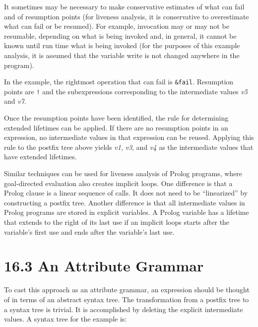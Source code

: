 It sometimes may be necessary to make conservative estimates of what
can fail and of resumption points (for liveness analysis, it is
conservative to overestimate what can fail or be resumed). For
example, invocation may or may not be resumable, depending on what is
being invoked and, in general, it cannot be known until run time what
is being invoked (for the purposes of this example analysis, it is
assumed that the variable write is not changed anywhere in the
program).

In the example, the rightmost operation that can fail is
\texttt{\&fail}. Resumption points are \texttt{!} and the
subexpressions corresponding to the intermediate values \textit{v5}
and \textit{v7}.

Once the resumption points have been identified, the rule for
determining extended lifetimes can be applied. If there are no
resumption points in an expression, no intermediate values in that
expression can be reused. Applying this rule to the postfix tree above
yields \textit{v1}, \textit{v3}, and \textit{v4} as the intermediate
values that have extended lifetimes.

Similar techniques can be used for liveness analysis of Prolog
programs, where goal-directed evaluation also creates implicit
loops. One difference is that a Prolog clause is a linear sequence of
calls. It does not need to be ``linearized'' by constructing a
postfix tree. Another difference is that all intermediate values in
Prolog programs are stored in explicit variables. A Prolog variable
has a lifetime that extends to the right of its last use if an
implicit loops starts after the variable's first use and ends after
the variable's last use.


\section[16.3 An Attribute Grammar]{16.3 An Attribute Grammar}

To cast this approach as an attribute grammar, an expression should be
thought of in terms of an abstract syntax tree.  The transformation
from a postfix tree to a syntax tree is trivial. It is accomplished by
deleting the explicit intermediate values. A syntax tree for the
example is:


\begin{center}
\end{center}

